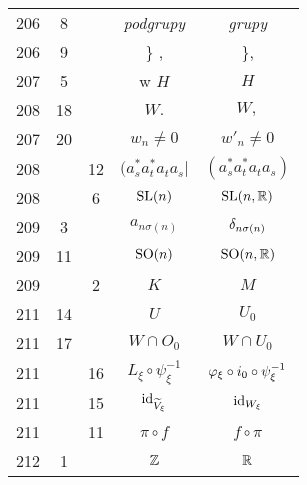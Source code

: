 \documentclass[a4paper,11pt]{article}
\begin{document}
\begin{center}
\begin{tabular}{|c|c|c|c|c|}
    206 &  8 & & \emph{podgrupy} & \emph{grupy} \\
    206 &  9 & & \} , & \}, \\
    207 &  5 & & w $H$ & $H$ \\
    208 & 18 & & $W.$ & $W,$ \\
    207 & 20 & & $w_{ n } \neq 0$ & $w'_{ n } \neq 0$ \\
    208 & & 12 & $( a^{ * }_{ s } a^{ * }_{ t } a_{ t } a_{ s } |$
           & $( a^{ * }_{ s } a^{ * }_{ t } a_{ t } a_{ s } )$ \\
    208 & &  6 & $\mathrm{SL}( n )$ & $\mathrm{SL}( n, \mathbb{R} )$ \\
    209 &  3 & & $a_{ n \sigma( n ) }$ & $\delta_{ n \sigma( n ) }$ \\
    209 & 11 & & $\mathrm{SO}( n )$ & $\mathrm{SO}( n, \mathbb{R} )$ \\
    209 & &  2 & $K$ & $M$ \\
    211 & 14 & & $U$ & $U_{ 0 }$ \\
    211 & 17 & & $W \! \cap \! O_{ 0 }$ & $W \! \cap \! U_{ 0 }$ \\
    211 & & 16 & $L_{ \xi } \circ \psi_{ \xi }^{ -1 }$
           & $\varphi_{ \xi } \circ i_{ 0 } \circ \psi_{ \xi }^{ -1 }$ \\
    211 & & 15 & $\mathrm{id}_{ \widetilde{ V }_{ \xi } }$ & $\mathrm{id}_{ W_{ \xi } }$ \\
    211 & & 11 & $\pi \circ f$ & $f \circ \pi$ \\
    212 &  1 & & $\mathbb{Z}$ & $\mathbb{R}$ \\
    \hline
  \end{tabular}


\end{center}
\end{document}
